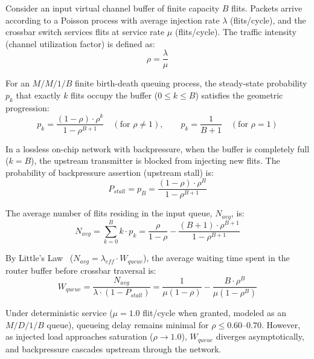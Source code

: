 Consider an input virtual channel buffer of finite capacity $B$ flits. Packets arrive according to a Poisson process with average injection rate $\lambda$ (flits/cycle), and the crossbar switch services flits at service rate $\mu$ (flits/cycle). The traffic intensity (channel utilization factor) is defined as:
\begin{equation}
\rho = \frac{\lambda}{\mu}
\label{eq:ch2_rho}
\end{equation}

For an $M/M/1/B$ finite birth-death queuing process, the steady-state probability $p_k$ that exactly $k$ flits occupy the buffer ($0 \le k \le B$) satisfies the geometric progression:
\begin{equation}
p_k = \frac{(1 - \rho) \cdot \rho^k}{1 - \rho^{B+1}} \quad (\text{for } \rho \ne 1), \qquad p_k = \frac{1}{B + 1} \quad (\text{for } \rho = 1)
\label{eq:ch2_steady_state_pk}
\end{equation}

In a lossless on-chip network with backpressure, when the buffer is completely full ($k = B$), the upstream transmitter is blocked from injecting new flits. The probability of backpressure assertion (upstream stall) is:
\begin{equation}
P_{stall} = p_B = \frac{(1 - \rho) \cdot \rho^B}{1 - \rho^{B+1}}
\label{eq:ch2_p_stall}
\end{equation}

The average number of flits residing in the input queue, $N_{avg}$, is:
\begin{equation}
N_{avg} = \sum_{k=0}^{B} k \cdot p_k = \frac{\rho}{1 - \rho} - \frac{(B + 1) \cdot \rho^{B+1}}{1 - \rho^{B+1}}
\label{eq:ch2_navg}
\end{equation}

By Little's Law~\cite{Little1961} ($N_{avg} = \lambda_{eff} \cdot W_{queue}$), the average waiting time spent in the router buffer before crossbar traversal is:
\begin{equation}
W_{queue} = \frac{N_{avg}}{\lambda \cdot (1 - P_{stall})} = \frac{1}{\mu(1 - \rho)} - \frac{B \cdot \rho^B}{\mu (1 - \rho^B)}
\label{eq:ch2_wqueue}
\end{equation}

Under deterministic service ($\mu = 1.0$ flit/cycle when granted, modeled as an $M/D/1/B$ queue), queueing delay remains minimal for $\rho \le 0.60\text{--}0.70$. However, as injected load approaches saturation ($\rho \to 1.0$), $W_{queue}$ diverges asymptotically, and backpressure cascades upstream through the network.

